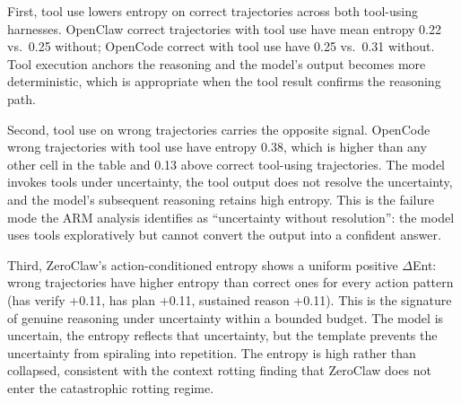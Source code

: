 First, tool use lowers entropy on correct trajectories across both
tool-using harnesses.
OpenClaw correct trajectories with tool use have mean entropy 0.22 vs.\
0.25 without; OpenCode correct with tool use have 0.25 vs.\ 0.31 without.
Tool execution anchors the reasoning and the model's output becomes more
deterministic, which is appropriate when the tool result confirms the
reasoning path.

Second, tool use on wrong trajectories carries the opposite signal.
OpenCode wrong trajectories with tool use have entropy 0.38, which is
higher than any other cell in the table and 0.13 above correct
tool-using trajectories.
The model invokes tools under uncertainty, the tool output does not
resolve the uncertainty, and the model's subsequent reasoning retains
high entropy.
This is the failure mode the ARM analysis identifies as
``uncertainty without resolution'': the model uses tools exploratively
but cannot convert the output into a confident answer.

Third, ZeroClaw's action-conditioned entropy shows a uniform positive
$\Delta$Ent: wrong trajectories have higher entropy than correct ones
for every action pattern (has verify +0.11, has plan +0.11, sustained
reason +0.11).
This is the signature of genuine reasoning under uncertainty within a
bounded budget.
The model is uncertain, the entropy reflects that uncertainty, but the
template prevents the uncertainty from spiraling into repetition.
The entropy is high rather than collapsed, consistent with the context
rotting finding that ZeroClaw does not enter the catastrophic rotting
regime.
